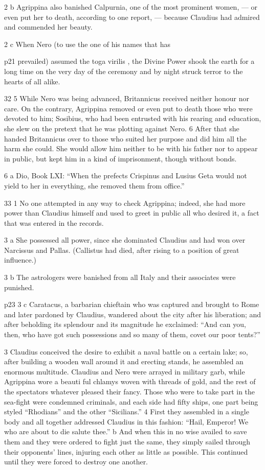 2 b
Agrippina also banished Calpurnia, one of the most prominent women, \texthebrew{—} or even put her to death, according to one report, \texthebrew{—} because Claudius had admired and commended her beauty.

2 c
When Nero (to use the one of his names that has

p21 prevailed) assumed the toga virilis , the Divine Power shook the earth for a long time on the very day of the ceremony and by night struck terror to the hearts of all alike.

32
5 While Nero was being advanced, Britannicus received neither honour nor care. On the contrary, Agrippina removed or even put to death those who were devoted to him; Sosibius, who had been entrusted with his rearing and education, she slew on the pretext that he was plotting against Nero. 6 After that she handed Britannicus over to those who suited her purpose and did him all the harm she could. She would allow him neither to be with his father nor to appear in public, but kept him in a kind of imprisonment, though without bonds.

6 a
Dio, Book LXI: ``When the prefects Crispinus and Lusius Geta would not yield to her in everything, she removed them from office.''

33
1 No one attempted in any way to check Agrippina; indeed, she had more power than Claudius himself and used to greet in public all who desired it, a fact that was entered in the records.

3 a
She possessed all power, since she dominated Claudius and had won over Narcissus and Pallas. (Callistus had died, after rising to a position of great influence.)

3 b
The astrologers were banished from all Italy and their associates were punished.

p23
3 c
Caratacus, a barbarian chieftain who was captured and brought to Rome and later pardoned by Claudius, wandered about the city after his liberation; and after beholding its splendour and its magnitude he exclaimed: ``And can you, then, who have got such possessions and so many of them, covet our poor tents?''

3
Claudius conceived the desire to exhibit a naval battle on a certain lake; so, after building a wooden wall around it and erecting stands, he assembled an enormous multitude. Claudius and Nero were arrayed in military garb, while Agrippina wore a beauti ­ful chlamys woven with threads of gold, and the rest of the spectators whatever pleased their fancy. Those who were to take part in the sea-fight were condemned criminals, and each side had fifty ships, one part being styled ``Rhodians'' and the other ``Sicilians.'' 4 First they assembled in a single body and all together addressed Claudius in this fashion: ``Hail, Emperor! We who are about to die salute thee.''\texthebrew{⁠} b And when this in no wise availed to save them and they were ordered to fight just the same, they simply sailed through their opponents' lines, injuring each other as little as possible. This continued until they were forced to destroy one another.

